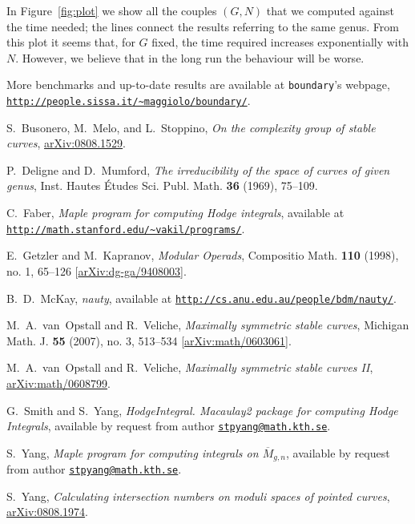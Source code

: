\documentclass{amsart}
\newcommand{\arXiv}[1]{\href{http://arxiv.org/abs/#1}{arXiv:#1}}
\theoremstyle{plain}
\theoremstyle{definition}
\begin{document}
In Figure~\ref{fig:plot} we show all the couples $(G, N)$ that we
computed against the time needed; the lines connect the results
referring to the same genus. From this plot it seems that, for $G$
fixed, the time required increases exponentially with $N$. However, we
believe that in the long run the behaviour will be worse.

More benchmarks and up-to-date results are available at
\texttt{boundary}'s webpage,
\href{http://people.sissa.it/~maggiolo/boundary/}
{\texttt{http://people.sissa.it/\~{}maggiolo/boundary/}}.

\begin{thebibliography}{2}

  S.~Busonero, M.~Melo, and L.~Stoppino,
  \emph{On the complexity group of stable curves},
  \arXiv{0808.1529}.%

  P.~Deligne and D.~Mumford,
  \emph{The irreducibility of the space of curves of given genus},
  Inst. Hautes \'Etudes Sci. Publ. Math. \textbf{36} (1969), 75--109.

  C.~Faber,
  \emph{Maple program for computing Hodge integrals},
  available at \href{http://math.stanford.edu/~vakil/programs/}
  {\texttt{http://math.stanford.edu/\~{}vakil/programs/}}.

  E.~Getzler and M.~Kapranov,
  \emph{Modular Operads},
  Compositio Math. \textbf{110} (1998), no. 1, 65--126
  [\arXiv{dg-ga/9408003}].

  B.~D.~McKay,
  \emph{nauty},
  available at \href{http://cs.anu.edu.au/people/bdm/nauty/}
  {\texttt{http://cs.anu.edu.au/people/bdm/nauty/}}.

  M.~A.~van~Opstall and R.~Veliche,
  \emph{Maximally symmetric stable curves},
  Michigan Math. J. \textbf{55} (2007), no. 3, 513--534
  [\arXiv{math/0603061}].

  M.~A.~van~Opstall and R.~Veliche,
  \emph{Maximally symmetric stable curves II},
  \arXiv{math/0608799}.%

  G.~Smith and S.~Yang,
  \emph{HodgeIntegral. Macaulay2 package for computing Hodge Integrals},
  available by request from author \href{mailto:stpyang@math.kth.se}
  {\texttt{stpyang@math.kth.se}}.

  S.~Yang,
  \emph{Maple program for computing integrals on $\overline{M}_{g,n}$},
  available by request from author \href{mailto:stpyang@math.kth.se}
  {\texttt{stpyang@math.kth.se}}.

  S.~Yang,
  \emph{Calculating intersection numbers on moduli spaces of pointed curves},
  \arXiv{0808.1974}.%

\end{thebibliography}
\end{document}
